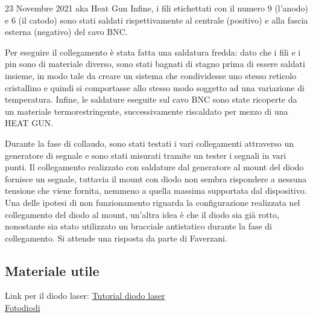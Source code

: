 \documentclass{article}
\numberwithin{equation}{section}
\begin{document}
\begin{section}{23 Novembre 2021 aka Heat Gun}
\noindent Infine, i fili etichettati con il numero 9 (l'anodo) e 6 (il catodo) sono stati saldati rispettivamente al centrale (positivo) e alla fascia esterna (negativo) del cavo BNC.

\noindent Per eseguire il collegamento è stata fatta una saldatura fredda: dato che i fili e i pin sono di materiale diverso, sono stati bagnati di stagno prima di essere saldati insieme, in modo tale da creare un sistema che condividesse uno stesso reticolo cristallino e quindi si comportasse allo stesso modo soggetto ad una variazione di temperatura. Infine, le saldature eseguite sul cavo BNC sono state ricoperte da un materiale termorestringente, successivamente riscaldato per mezzo di una HEAT GUN. 

\noindent Durante la fase di collaudo, sono stati testati i vari collegamenti attraverso un generatore di segnale e  sono stati misurati tramite un tester i segnali in vari punti. Il collegamento realizzato con saldature dal generatore al mount del diodo fornisce un segnale, tuttavia il mount con diodo non sembra rispondere a nessuna tensione che viene fornita, nemmeno a quella massima supportata dal dispositivo. Una delle ipotesi di non funzionamento riguarda la configurazione realizzata nel collegamento del diodo al mount, un'altra idea è che il diodo sia già rotto, nonostante sia stato utilizzato un bracciale antistatico durante la fase di collegamento. Si attende una risposta da parte di Faverzani.

\subsection{Materiale utile}
Link per il diodo laser:
\href{https://www.thorlabs.com/newgrouppage9.cfm?objectgroup_id=1832}{Tutorial diodo laser}\\
\href{https://www.thorlabs.com/newgrouppage9.cfm?objectgroup_id=285}{Fotodiodi}
\end{section}
\end{document}
